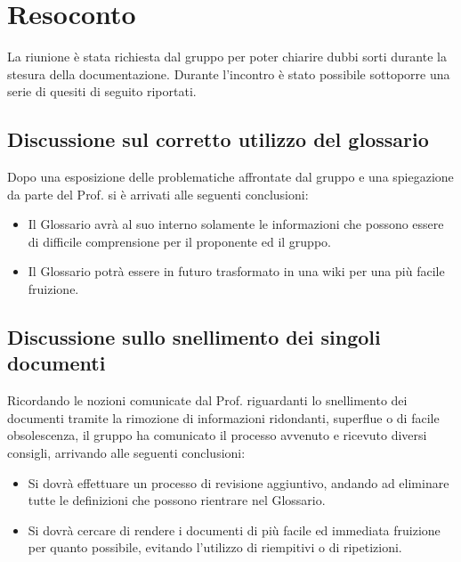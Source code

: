 \newpage


\section{Resoconto}
La riunione è stata richiesta dal gruppo \textit{\Gruppo{}} per poter chiarire dubbi sorti durante la stesura della documentazione.
Durante l'incontro è stato possibile sottoporre una serie di quesiti di seguito riportati.
\subsection{Discussione sul corretto utilizzo del glossario}
Dopo una esposizione delle problematiche affrontate dal gruppo e una spiegazione da parte del Prof. \Tullio{} si è arrivati alle seguenti conclusioni:
\begin{itemize}
	\item Il Glossario avrà al suo interno solamente le informazioni che possono essere di difficile comprensione per il proponente ed il gruppo.
	\item Il Glossario potrà essere in futuro trasformato in una wiki per una più facile fruizione.
\end{itemize}
\subsection{Discussione sullo snellimento dei singoli documenti}
Ricordando le nozioni comunicate dal Prof. \Tullio{} riguardanti lo snellimento dei documenti tramite la rimozione di informazioni ridondanti, superflue o di facile obsolescenza, il gruppo ha comunicato il processo avvenuto e ricevuto diversi consigli, arrivando alle seguenti conclusioni:
\begin{itemize}
	\item Si dovrà effettuare un processo di revisione aggiuntivo, andando ad eliminare tutte le definizioni che possono rientrare nel Glossario.
	\item Si dovrà cercare di rendere i documenti di più facile ed immediata fruizione per quanto possibile, evitando l'utilizzo di riempitivi o di ripetizioni.
\end{itemize}
